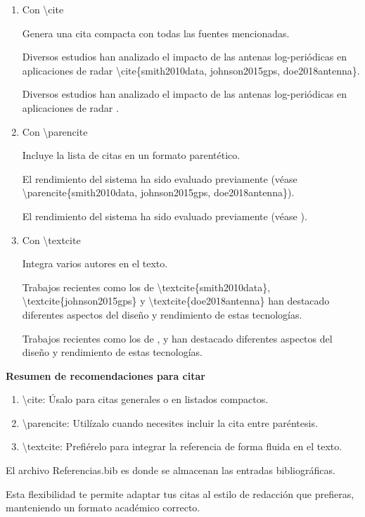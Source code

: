\begin{enumerate}
    \item Con \textbackslash cite

    Genera una cita compacta con todas las fuentes mencionadas.
    
    Diversos estudios han analizado el impacto de las antenas log-periódicas en aplicaciones de radar \textbackslash cite\{smith2010data, johnson2015gps, doe2018antenna\}.

    Diversos estudios han analizado el impacto de las antenas log-periódicas en aplicaciones de radar \cite{smith2010data, johnson2015gps, doe2018antenna}.

    \item Con \textbackslash parencite

    Incluye la lista de citas en un formato parentético.
    
    El rendimiento del sistema ha sido evaluado previamente (véase \textbackslash parencite\{smith2010data, johnson2015gps, doe2018antenna\}).

    El rendimiento del sistema ha sido evaluado previamente (véase \parencite{smith2010data, johnson2015gps, doe2018antenna}).

    \item Con \textbackslash textcite

    Integra varios autores en el texto.
    
    Trabajos recientes como los de \textbackslash textcite\{smith2010data\}, \textbackslash textcite\{johnson2015gps\} y \textbackslash textcite\{doe2018antenna\} han destacado diferentes aspectos del diseño y rendimiento de estas tecnologías.

    Trabajos recientes como los de \textcite{smith2010data}, \textcite{johnson2015gps} y \textcite{doe2018antenna} han destacado diferentes aspectos del diseño y rendimiento de estas tecnologías.
    
\end{enumerate}

\textbf{Resumen de recomendaciones para citar}

\begin{enumerate}
    \item \textbackslash cite: Úsalo para citas generales o en listados compactos.
    \item \textbackslash parencite: Utilízalo cuando necesites incluir la cita entre paréntesis.
    \item \textbackslash textcite: Prefiérelo para integrar la referencia de forma fluida en el texto.
\end{enumerate}

El archivo Referencias.bib es donde se almacenan las entradas bibliográficas.

Esta flexibilidad te permite adaptar tus citas al estilo de redacción que prefieras, manteniendo un formato académico correcto.